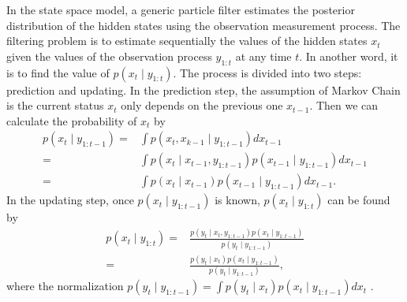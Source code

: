 In the state space model, a generic particle filter estimates the posterior distribution of the hidden states using the observation measurement process. The filtering problem is to estimate sequentially the values of the hidden states $x_t $ given the values of the observation process $y_{1:t}$ at any time $t$. In another word, it is to find the value of $p(x_t  \mid  y_{1:t})$. The process is divided into two steps: prediction and updating. In the prediction step, the assumption of Markov Chain is the current status $x_t $ only depends on the previous one $x_{t-1}$. Then we can calculate the probability of $x_t $ by 
\begin{align*}
p(x_t \mid y_{1:t-1})=&\int p(x_t ,x_{k-1}\mid y_{1:t-1}) dx_{t-1}\\
=&\int p(x_t \mid x_{t-1},y_{1:t-1}) p(x_{t-1}\mid y_{1:t-1})dx_{t-1}\\
=&\int p(x_t \mid x_{t-1}) p(x_{t-1}\mid y_{1:t-1})dx_{t-1}.
\end{align*}
In the updating step, once $p(x_t \mid y_{1:t-1})$ is known, $p(x_t \mid y_{1:t})$ can be found by
\begin{align*}
p(x_t \mid y_{1:t})=&\frac{p(y_t \mid x_t ,y_{1:t-1})p(x_{t}\mid y_{1:t-1})}{p(y_t \mid  y_{1:t-1})} \\
=&\frac{p(y_t \mid x_t )p(x_{t}\mid y_{1:t-1})}{p(y_t \mid  y_{1:t-1})},
\end{align*}
where the normalization $p(y_t \mid  y_{1:t-1})=\int p(y_t \mid x_t )p(x_t \mid  y_{1:t-1}) dx_t $ \cite{arulampalam2002tutorial}.

